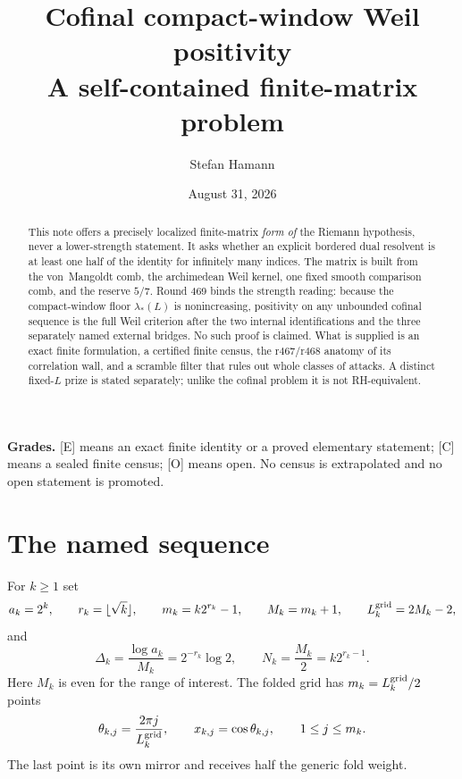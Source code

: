 \documentclass[11pt]{article}
\title{\bfseries Cofinal compact-window Weil positivity\\[2mm]
\large A self-contained finite-matrix problem}
\author{Stefan Hamann}
\date{August 31, 2026}
\newcommand{\Egrade}{\textnormal{\small[E]}}
\newcommand{\Cgrade}{\textnormal{\small[C]}}
\newcommand{\Ograde}{\textnormal{\small[O]}}
\begin{document}
\maketitle

\begin{abstract}\noindent
This note offers a precisely localized finite-matrix \emph{form of}
the Riemann hypothesis, never a lower-strength statement.  It asks
whether an explicit bordered dual resolvent is at least one half of
the identity for infinitely many indices.  The matrix is built from
the von~Mangoldt comb, the archimedean Weil kernel, one fixed smooth
comparison comb, and the reserve $5/7$.  Round 469 binds the strength
reading: because the compact-window floor $\lambda_*(L)$ is
nonincreasing, positivity on any unbounded cofinal sequence is the
full Weil criterion after the two internal identifications and the
three separately named external bridges.  No such proof is claimed.
What is supplied is an exact finite formulation, a certified finite
census, the r467/r468 anatomy of its correlation wall, and a
scramble filter that rules out whole classes of attacks.  A distinct
fixed-$L$ prize is stated separately; unlike the cofinal problem it
is not RH-equivalent.
\end{abstract}

\medskip\noindent
\textbf{Grades.}\enspace
\Egrade{} means an exact finite identity or a proved elementary
statement; \Cgrade{} means a sealed finite census; \Ograde{} means open.
No census is extrapolated and no open statement is promoted.

\medskip\noindent
{}

\section{The named sequence}

For $k\ge1$ set
\begin{equation}\label{eq:sequence}
 a_k=2^k,\qquad r_k=\lfloor\sqrt{k}\rfloor,\qquad
 m_k=k2^{r_k}-1,\qquad M_k=m_k+1,\qquad
 L_k^{\rm grid}=2M_k-2,
\end{equation}
and
\begin{equation}\label{eq:delta}
 \Delta_k=\frac{\log a_k}{M_k}=2^{-r_k}\log2,\qquad
 N_k=\frac{M_k}{2}=k2^{r_k-1}.
\end{equation}
Here $M_k$ is even for the range of interest.  The folded grid has
$m_k=L_k^{\rm grid}/2$ points
\[
 \theta_{k,j}=\frac{2\pi j}{L_k^{\rm grid}},\qquad
 x_{k,j}=\cos\theta_{k,j},\qquad 1\le j\le m_k .
\]
The last point is its own mirror and receives half the generic fold
weight.
\end{document}
